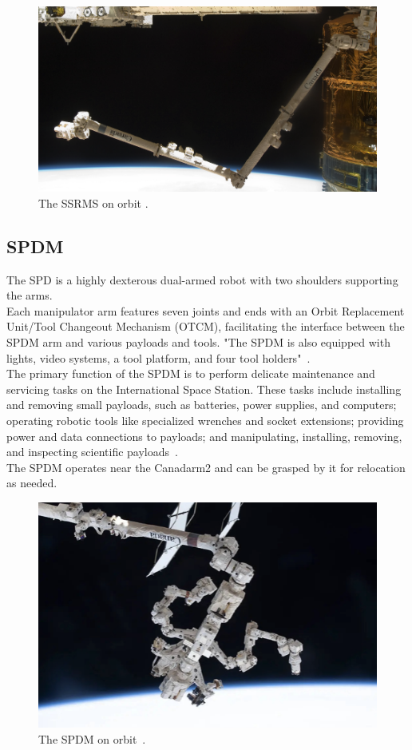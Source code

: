 \documentclass[a4paper,12pt,oneside]{report}
\begin{document}
\begin{figure}[b]
  \centering
  \includegraphics[scale=0.35]{SSRMS_orbit.png}
  \caption{The SSRMS on orbit \cite{seven}.}
  \label{SSRMS_orbit}
\end{figure}
\newpage
\subsection{SPDM}
The SPD is a highly dexterous dual-armed robot with two shoulders supporting the arms.\\
Each manipulator arm features seven joints and ends with an Orbit Replacement Unit/Tool Changeout Mechanism (OTCM), facilitating the interface between the SPDM arm and various payloads and tools. "The SPDM is also equipped with lights, video systems, a tool platform, and four tool holders"~\cite{sheet}.\\
The primary function of the SPDM is to perform delicate maintenance and servicing tasks on the International Space Station. These tasks include installing and removing small payloads, such as batteries, power supplies, and computers; operating robotic tools like specialized wrenches and socket extensions; providing power and data connections to payloads; and manipulating, installing, removing, and inspecting scientific payloads~\cite{sheet}.\\
The SPDM operates near the Canadarm2 and can be grasped by it for relocation as needed.
\begin{figure}[h]
  \centering
  \includegraphics[scale=0.6]{SPDM.png}
  \caption{The SPDM on orbit~\cite{nasa}.}
  \label{SPDM_orbit}
\end{figure}
\end{document}
